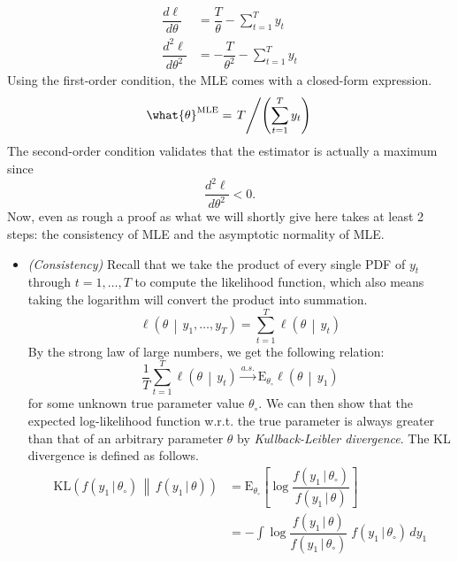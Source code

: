\documentclass[answers]{exam}
\begin{document}
\begin{questions}
\begin{solution}
\begin{enumerate}[a)]
\begin{align}
        \dfrac{d\ell}{d\theta} &= \dfrac{T}{\theta}-\sum_{t=1}^{T}y_{t}\\
        \dfrac{d^{2}\ell}{d\theta^{2}} &= -\dfrac{T}{\theta^{2}}-\sum_{t=1}^{T}y_{t}
      \end{align}
      Using the first-order condition, the MLE comes with a closed-form expression.
      \begin{equation}
        \what{\theta}^{\text{MLE}} = \left.T\middle/\left(\sum_{t=1}^{T}y_{t}\right)\right.
      \end{equation}
      The second-order condition validates that the estimator is actually a maximum since
      \begin{equation}
        \dfrac{d^{2}\ell}{d\theta^{2}} < 0.
      \end{equation}
      Now, even as rough a proof as what we will shortly give here takes at least 2 steps: the consistency of MLE and the asymptotic normality of MLE.
      \begin{itemize}
        \item \emph{(Consistency)} Recall that we take the product of every single PDF of $y_{t}$ through $t=1,\ldots,T$ to compute the likelihood function, which also means taking the logarithm will convert the product into summation.
        \begin{equation}
          \ell\left(\theta\,\middle|\,y_{1},\ldots,y_{T}\right) = \sum_{t=1}^{T}\ell\left(\theta\,\middle|\,y_{t}\right)
        \end{equation}
        By the strong law of large numbers, we get the following relation:
        \begin{equation}\label{eq:1}
          \dfrac{1}{T}\sum_{t=1}^{T}\ell\left(\theta\,\middle|\,y_{t}\right)\xrightarrow{a.s.}\mathrm{E}_{\theta_{\circ}}\ell\left(\theta\,\middle|\,y_{1}\right)
        \end{equation}
        for some unknown true parameter value $\theta_{\circ}$. We can then show that the expected log-likelihood function w.r.t. the true parameter is always greater than that of an arbitrary parameter $\theta$ by \emph{Kullback-Leibler divergence}. The KL divergence is defined as follows.
        \begin{align}
          \mathrm{KL}\left(f(y_{1}\,|\,\theta_{\circ})\,\middle\|\,f(y_{1}\,|\,\theta)\right) &= \mathrm{E}_{\theta_{\circ}}\left[\log \dfrac{f(y_{1}\,|\,\theta_{\circ})}{f(y_{1}\,|\,\theta)} \right]\\
          &= -\int \log \dfrac{f(y_{1}\,|\,\theta)}{f(y_{1}\,|\,\theta_{\circ})}\; f(y_{1}\,|\,\theta_{\circ})\,dy_{1}

\end{align}
\end{itemize}
\end{enumerate}
\end{solution}
\end{questions}
\end{document}
